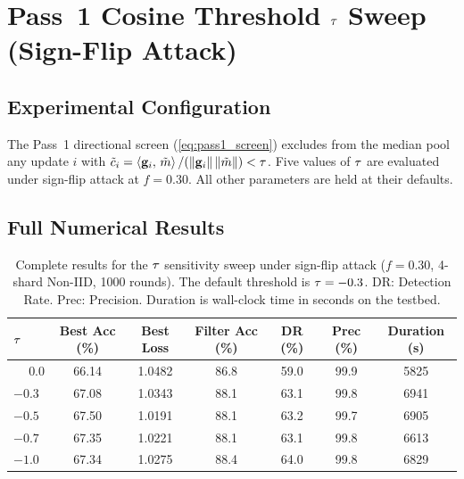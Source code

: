 \documentclass[../main]{subfiles}
\begin{document}
\section{Pass~1 Cosine Threshold \texorpdfstring{$\tau$}{tau\_cos} Sweep (Sign-Flip Attack)}
\label{app:cos_sweep}

\subsection{Experimental Configuration}
\label{app:cos_sweep_config}

The Pass~1 directional screen (\cref{eq:pass1_screen}) excludes from the
median pool any update $i$ with
$\tilde{c}_i = \left\langle \mathbf{g}_{i},\, \tilde{m} \right\rangle / (\left\lVert \mathbf{g}_{i} \right\rVert\left\lVert \tilde{m} \right\rVert) < \tau$.
Five values of $\tau$ are evaluated under sign-flip attack at $f=0.30$.
All other \aegis{} parameters are held at their defaults.

\subsection{Full Numerical Results}
\label{app:cos_sweep_results}

\begin{table}[htbp]
\centering
\caption{Complete results for the $\tau$ sensitivity sweep under sign-flip attack
($f=0.30$, 4-shard Non-IID, 1000 rounds).
The default threshold is $\tau = -0.3$. DR: Detection Rate. Prec: Precision.
Duration is wall-clock time in seconds on the testbed.}
\label{tab:app_tau_cos_full}
\small
\setlength{\tabcolsep}{4pt}
\begin{tabular}{lcccccc}
\toprule
$\tau$ & \textbf{Best Acc (\%)} & \textbf{Best Loss}
             & \textbf{Filter Acc (\%)} & \textbf{DR (\%)}
             & \textbf{Prec (\%)} & \textbf{Duration (s)} \\
\midrule
$\phantom{-}0.0$       & 66.14 & 1.0482 & 86.8 & 59.0 & 99.9 & 5825 \\
$-0.3$                 & 67.08 & 1.0343 & 88.1 & 63.1 & 99.8 & 6941 \\
$-0.5$                 & 67.50 & 1.0191 & 88.1 & 63.2 & 99.7 & 6905 \\
$-0.7$                 & 67.35 & 1.0221 & 88.1 & 63.1 & 99.8 & 6613 \\
$-1.0$                 & 67.34 & 1.0275 & 88.4 & 64.0 & 99.8 & 6829 \\
\bottomrule
\end{tabular}
\end{table}
\end{document}
